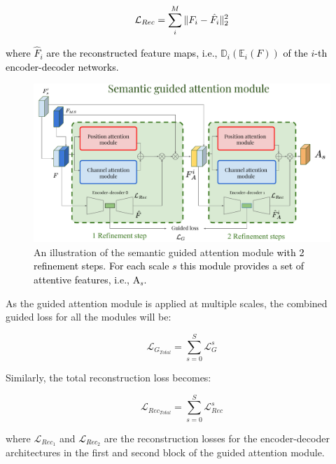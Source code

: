 \documentclass[journal]{IEEEtran}
\begin{document}

\begin{equation}
    \textcolor{black}{\mathcal{L}_{Rec} = \sum_i^{M}\|F_i-\hat F_i\|_2^2}
    \label{eq:rec_loss}
\end{equation}

\textcolor{black}{where $\hat F_i$ are the reconstructed feature maps, i.e., $\mathbb{D}_i(\mathbb{E}_i(F))$ of the $i$-th encoder-decoder networks. }

\begin{figure}[h!]
    \centering
    \includegraphics[width=.45\textwidth]{Semantic_Guided_Revision.pdf}
    \caption{An illustration of the semantic guided attention module \textcolor{black}{with 2 refinement steps. For each scale $s$ this module provides a set of attentive features, i.e., A$_s$.}}
    \label{fig:guidedModule}
\end{figure}




As the guided attention module is applied at multiple scales, the combined guided loss for all the modules will be:

\begin{equation}
    \mathcal{L}_{G_{Total}} = \sum_{s=0}^S\mathcal{L}_{G}^s
\end{equation}

Similarly, the total reconstruction loss becomes:

\begin{equation}
    \mathcal{L}_{Rec_{Total}} = \sum_{s=0}^S\mathcal{L}_{Rec}^s
\end{equation}

where $\mathcal{L}_{Rec_1}$ and \textcolor{black}{$\mathcal{L}_{Rec_2}$} are the reconstruction losses for the encoder-decoder architectures in the first and second block of the guided attention module.
\end{document}

